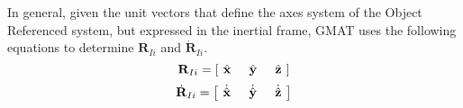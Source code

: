 {In general, given the unit vectors that define the axes system of
the Object Referenced system, but expressed in the inertial frame,
GMAT uses the following equations to determine $\mathbf{R}_{Ii}$
and $ \dot{\mathbf{R}}_{Ii}$.
%
\begin{equation}
     \mathbf{R}_{Ii} = \left[\hspace{.05 in} \hat{\mathbf{x}} \hspace{.2 in} \hat{\mathbf{y}} \hspace{.2 in} \hat{\mathbf{z}} \hspace{.05 in} \right]
\end{equation}
%
\begin{equation}
     \dot{\mathbf{R}}_{Ii} = \left[\hspace{.05 in} \dot{\hat{\mathbf{x}}} \hspace{.2 in}
     \dot{\hat{\mathbf{y}}} \hspace{.2 in} \dot{\hat{\mathbf{z}}} \hspace{.05 in} \right]
\end{equation}
%

}
